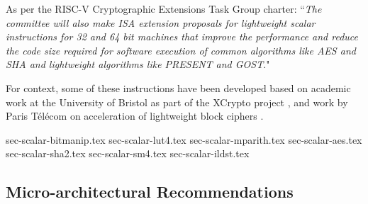 
As per the RISC-V Cryptographic Extensions Task Group charter:
``{\em The committee will also make ISA extension proposals for lightweight
scalar instructions for 32 and 64 bit machines that improve the performance
and reduce the code size required for software execution of common algorithms
like AES and SHA and lightweight algorithms like PRESENT and GOST}."

\bigskip

For context, some of these instructions have been developed based on academic
work at the University of Bristol as part of the XCrypto project
\cite{MPP:19},
and work by
Paris T\'{e}l\'{e}com on acceleration of lightweight block ciphers
\cite{TGMGD:19}.



{sec-scalar-bitmanip.tex}
{sec-scalar-lut4.tex}
{sec-scalar-mparith.tex}
{sec-scalar-aes.tex}
{sec-scalar-sha2.tex}
{sec-scalar-sm4.tex}
{sec-scalar-ildst.tex}


\subsection{Micro-architectural Recommendations}



